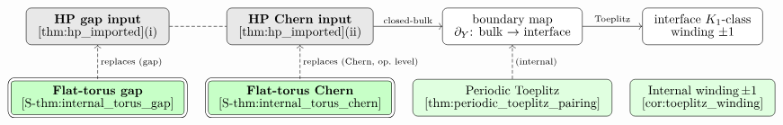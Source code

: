 \documentclass[11pt]{article}
\numberwithin{equation}{section}
\theoremstyle{definition}
\theoremstyle{remark}
\begin{document}
\begin{figure}[H]
\centering
\[
\begin{tikzcd}[row sep=2.6em, column sep=1.4em]
|[draw, rounded corners, fill=gray!18]|
  \begin{array}{c}\text{\textbf{HP gap input}}\\[-0.2em]\text{\Cref{thm:hp_imported}(i)}\end{array}
  \arrow[r, dashed, no head]
& |[draw, rounded corners, fill=gray!18]|
  \begin{array}{c}\text{\textbf{HP Chern input}}\\[-0.2em]\text{\Cref{thm:hp_imported}(ii)}\end{array}
  \arrow[r, "\text{closed-bulk}"]
& |[draw, rounded corners, fill=white]|
  \begin{array}{c}\text{boundary map}\\[-0.2em]\text{\(\partial_Y\): bulk \(\to\) interface}\end{array}
  \arrow[r, "\text{Toeplitz}"]
& |[draw, rounded corners, fill=white]|
  \begin{array}{c}\text{interface \(K_1\)-class}\\[-0.2em]\text{winding \(\pm1\)}\end{array} \\
|[draw, rounded corners, fill=green!22, double, double distance=2pt]|
  \begin{array}{c}\text{\textbf{Flat-torus gap}}\\[-0.2em]\text{\Cref{S-thm:internal_torus_gap}}\end{array}
  \arrow[u, "\text{replaces (gap)}"', dashed]
& |[draw, rounded corners, fill=green!22, double, double distance=2pt]|
  \begin{array}{c}\text{\textbf{Flat-torus Chern}}\\[-0.2em]\text{\Cref{S-thm:internal_torus_chern}}\end{array}
  \arrow[u, "\text{replaces (Chern, op.\ level)}"', dashed]
& |[draw, rounded corners, fill=green!12]|
  \begin{array}{c}\text{Periodic Toeplitz}\\[-0.2em]\text{\Cref{thm:periodic_toeplitz_pairing}}\end{array}
  \arrow[u, "\text{(internal)}"', dashed]
& |[draw, rounded corners, fill=green!12]|
  \begin{array}{c}\text{Internal winding\,\(\pm1\)}\\[-0.2em]\text{\Cref{cor:toeplitz_winding}}\end{array}

\end{tikzcd}\]
\end{figure}
\end{document}
